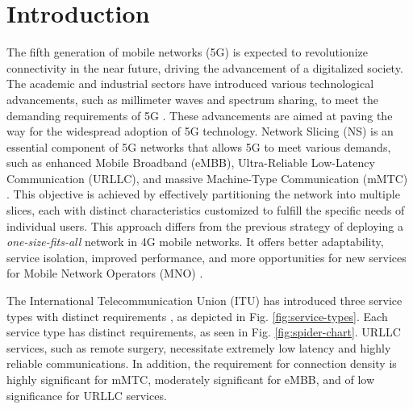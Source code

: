 \documentclass[conference]{IEEEtran}
\begin{document}
\section{Introduction}%
The fifth generation of mobile networks (5G) is expected to revolutionize connectivity in the near future, driving the advancement of a digitalized society. The academic and industrial sectors have introduced various technological advancements, such as millimeter waves and spectrum sharing, to meet the demanding requirements of 5G \cite{itu15m2083,ituk20zakeri}. These advancements are aimed at paving the way for the widespread adoption of 5G technology. Network Slicing (NS) is an essential component of 5G networks that allows 5G to meet various demands, such as enhanced Mobile Broadband (eMBB), Ultra-Reliable Low-Latency Communication (URLLC), and massive Machine-Type Communication (mMTC) \cite{ngmn15wp5g}. This objective is achieved by effectively partitioning the network into multiple slices, each with distinct characteristics customized to fulfill the specific needs of individual users. This approach differs from the previous strategy of deploying a \textit{one-size-fits-all} network in 4G mobile networks. It offers better adaptability, service isolation, improved performance, and more opportunities for new services for Mobile Network Operators (MNO) \cite{gsma18usecase}.

The International Telecommunication Union (ITU) has introduced three service types with distinct requirements \cite{itu15m2083}, as depicted in Fig. \ref{fig:service-types}. Each service type has distinct requirements, as seen in Fig. \ref{fig:spider-chart}. URLLC services, such as remote surgery, necessitate extremely low latency and highly reliable communications. In addition, the requirement for connection density is highly significant for mMTC, moderately significant for eMBB, and of low significance for URLLC services. 
\end{document}
